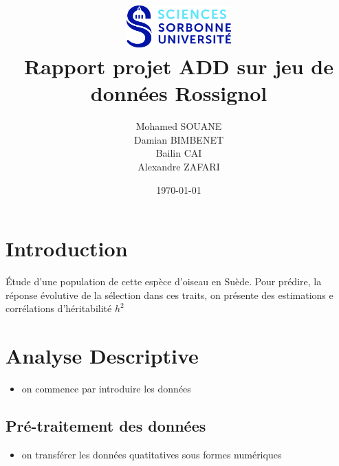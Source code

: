 \documentclass[12pt]{article}
\begin{document}
\title{\includegraphics[width=4cm]{LOGO_SCIENCES_DEF_CMJN.jpg}\\Rapport projet ADD sur jeu de donn\'ees Rossignol}
\author{Mohamed SOUANE\\
        Damian BIMBENET\\
        Bailin CAI\\
        Alexandre ZAFARI\\
}
\date{\today}
\maketitle

\section{Introduction}

\'Etude d'une population de cette espèce d'oiseau en Suède. Pour prédire, la réponse
évolutive de la sélection dans ces traits, on présente des estimations e corrélations d'héritabilité $h^2$

\section{Analyse Descriptive}
\begin{itemize}
\item on commence par introduire les donn\'ees
\end{itemize}

\subsection{Pr\'e-traitement des données}
\begin{itemize}
    \item on transf\'erer les donn\'ees quatitatives sous formes numériques
\end{itemize}
\end{document}
